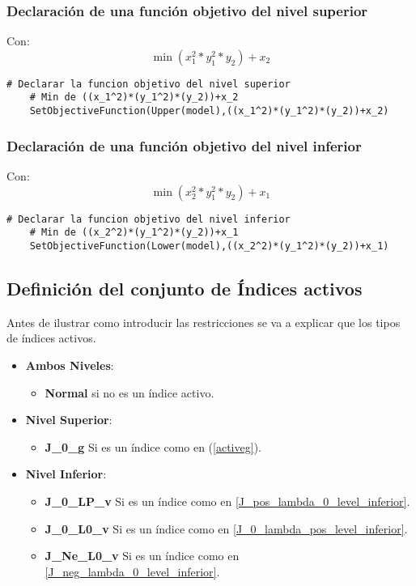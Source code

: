 \subsubsection{ Declaración de una función objetivo del nivel superior}
Con: $$\min (x_1^2*y_1^2*y_2) + x_2$$
\begin{lstlisting}[caption={ Declarar una función objetivo del nivel superior}]
    # Declarar la funcion objetivo del nivel superior
    # Min de ((x_1^2)*(y_1^2)*(y_2))+x_2
    SetObjectiveFunction(Upper(model),((x_1^2)*(y_1^2)*(y_2))+x_2)
\end{lstlisting}

\subsubsection{Declaración de una función objetivo del nivel inferior}

Con: $$\min (x_2^2*y_1^2*y_2)+x_1$$
\begin{lstlisting}[caption={Declarar una función objetivo del nivel inferior.}]
    # Declarar la funcion objetivo del nivel inferior
    # Min de ((x_2^2)*(y_1^2)*(y_2))+x_1
    SetObjectiveFunction(Lower(model),((x_2^2)*(y_1^2)*(y_2))+x_1)
\end{lstlisting}

\subsection{Definición del conjunto de Índices activos}

Antes de ilustrar como introducir las restricciones se va a explicar 
que los tipos de índices activos.

\begin{itemize}
    \item \textbf{Ambos Niveles}:
        \begin{itemize}
            \item \textbf{Normal} si no es un índice activo.
        \end{itemize}
    \item \textbf{Nivel Superior}:
     \begin{itemize}
        \item \textbf{J\_0\_g} Si es un índice como en (\ref{activeg}).
     \end{itemize}
    \item \textbf{Nivel Inferior}:
    \begin{itemize}
        \item \textbf{J\_0\_LP\_v} Si es un índice como en \ref{J_pos_lambda_0_level_inferior}.
        \item  \textbf{J\_0\_L0\_v} Si es un índice como en \ref{J_0_lambda_pos_level_inferior}.
        \item  \textbf{J\_Ne\_L0\_v} Si es un índice como en \ref{J_neg_lambda_0_level_inferior}.
    \end{itemize}
\end{itemize}


